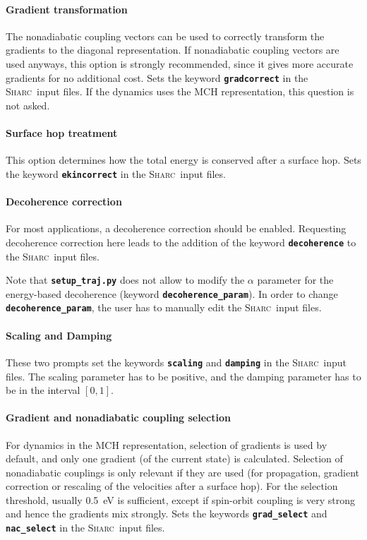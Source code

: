 \documentclass[a4paper,10pt,DIV=15,openany,twoside=false]{scrbook}
\newcommand{\sharc}{\textsc{Sharc}}
\newcommand{\ttt}[1]{\textbf{\texttt{#1}}}
\begin{document}
\paragraph{Gradient transformation}

The nonadiabatic coupling vectors can be used to correctly transform the gradients to the diagonal representation. If nonadiabatic coupling vectors are used anyways, this option is strongly recommended, since it gives more accurate gradients for no additional cost. Sets the keyword \ttt{gradcorrect} in the \sharc\ input files. If the dynamics uses the MCH representation, this question is not asked. 

\paragraph{Surface hop treatment}

This option determines how the total energy is conserved after a surface hop. Sets the keyword \ttt{ekincorrect} in the \sharc\ input files.

\paragraph{Decoherence correction}

For most applications, a decoherence correction should be enabled. Requesting decoherence correction here leads to the addition of the keyword \ttt{decoherence} to the \sharc\ input files. 

Note that \ttt{setup\_traj.py} does not allow to modify the $\alpha$ parameter for the energy-based decoherence (keyword \ttt{decoherence\_param}). In order to change \ttt{decoherence\_param}, the user has to manually edit the \sharc\ input files.

\paragraph{Scaling and Damping}

These two prompts set the keywords \ttt{scaling} and \ttt{damping} in the \sharc\ input files. The scaling parameter has to be positive, and the damping parameter has to be in the interval $[0,1]$.

\paragraph{Gradient and nonadiabatic coupling selection}

For dynamics in the MCH representation, selection of gradients is used by default, and only one gradient (of the current state) is calculated. Selection of nonadiabatic couplings is only relevant if they are used (for propagation, gradient correction or rescaling of the velocities after a surface hop). For the selection threshold, usually 0.5~eV is sufficient, except if spin-orbit coupling is very strong and hence the gradients mix strongly.
Sets the keywords \ttt{grad\_select} and \ttt{nac\_select} in the \sharc\ input files.
\end{document}
